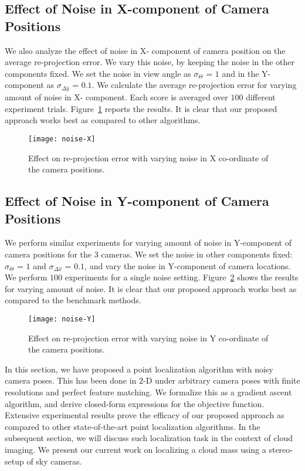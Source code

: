 \subsection{Effect of Noise in X-component of Camera Positions}

We also analyze the effect of noise in X- component of camera position on the average re-projection error. We vary this noise, by keeping the noise in the other components fixed. We set the noise in view angle as $\sigma_{\Theta}$ = $1$ and in the Y-component as $\sigma_{\Delta \hat{y}}$ = $0.1$. We calculate the average re-projection error for varying amount of noise in X- component. Each score is averaged over $100$ different experiment trials. Figure~\ref{fig:noise-X} reports the results. It is clear that our proposed approach works best as compared to other algorithms.
\begin{figure}[htb]
\centering
\texttt{[image: noise-X]}
\caption{Effect on re-projection error with varying noise in X co-ordinate of the camera positions.}
\label{fig:noise-X}	
\end{figure}


\subsection{Effect of Noise in Y-component of Camera Positions}

We perform similar experiments for varying amount of noise in Y-component of camera positions for the $3$ cameras. We set the noise in other components fixed: $\sigma_{\Theta}$ = $1$ and $\sigma_{\Delta \hat{x}}$ = $0.1$, and vary the noise in Y-component of camera locations. We perform $100$ experiments for a single noise setting. Figure~\ref{fig:noise-Y} shows the results for varying amount of noise. It is clear that our proposed approach works best as compared to the benchmark methods.

\begin{figure}[htb]
\centering
\texttt{[image: noise-Y]}
\caption{Effect on re-projection error with varying noise in Y co-ordinate of the camera positions.}
\label{fig:noise-Y}		
\end{figure}

In this section, we have proposed a point localization algorithm with noisy camera poses. This has been done in $2$-D under arbitrary camera poses with finite resolutions and perfect feature matching. We formalize this as a gradient ascent algorithm, and derive closed-form expressions for the objective function. Extensive experimental results prove the efficacy of our proposed approach as compared to other state-of-the-art point localization algorithms. In the subsequent section, we will discuss such localization task in the context of cloud imaging. We present our current work on localizing a cloud mass using a stereo-setup of sky cameras. 


